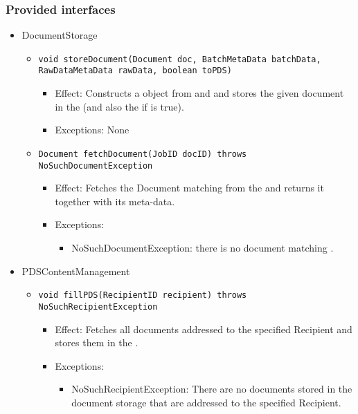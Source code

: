 \subsubsection*{Provided interfaces}
\begin{itemize}
    \item DocumentStorage
	\begin{itemize}
		\item \texttt{void storeDocument(Document doc, BatchMetaData batchData, RawDataMetaData rawData, boolean toPDS)}
		\begin{itemize}
			\item Effect: Constructs a  object from  and  and stores the given document in the  (and also the  if  is true).
			\item Exceptions: None
		\end{itemize}
		
		\item \texttt{Document fetchDocument(JobID docID) throws NoSuchDocumentException}
		\begin{itemize}
			\item Effect: Fetches the Document matching  from the  and returns it together with its meta-data.
			\item Exceptions: 
			\begin{itemize}
				\item NoSuchDocumentException: there is no document matching .
			\end{itemize}
		\end{itemize}
	\end{itemize}

	\item PDSContentManagement
	\begin{itemize}
		\item \texttt{void fillPDS(RecipientID recipient) throws NoSuchRecipientException}
		\begin{itemize}
			\item Effect: Fetches all documents addressed to the specified Recipient and stores them in the .
			\item Exceptions:
			\begin{itemize}
				\item NoSuchRecipientException: There are no documents stored in the document storage that are addressed to the specified Recipient.
			\end{itemize}
		\end{itemize}
				

\end{itemize}
\end{itemize}
